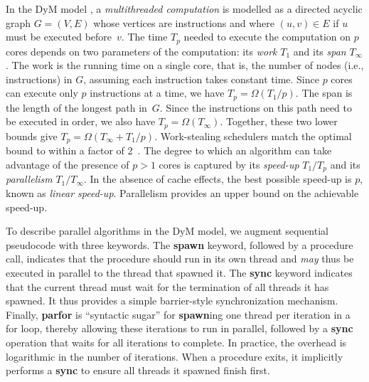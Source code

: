 In the DyM model \cite[Chapter~27]{Cormen2009}, a {\em multithreaded
computation} is modelled as a directed acyclic graph $G=(V,E)$
whose vertices are instructions and where $(u,v) \in E$ if
$u$ must be executed before~$v$.  The time $T_p$ needed to execute the
computation on $p$ cores depends on two parameters of the computation:
its {\em work} $T_1$ and its {\em span} $T_\infty$.  The work is the
running time on a single core, that is, the number of nodes
(i.e., instructions) in $G$, assuming each instruction takes constant
time.  Since $p$ cores can execute only $p$ instructions at a time, we
have $T_p = \Omega(T_1/p)$.  The span is the length of the longest
path in~$G$.  Since the instructions on this path need to be executed
in order, we also have $T_p = \Omega(T_\infty)$.
Together, these two lower bounds give $T_p = \Omega(T_\infty +
T_1/p)$.
Work-stealing schedulers match the optimal bound to within
a factor of 2~\cite{Blumofe:1999:SMC:324133.324234}.  The degree to
which an algorithm can take advantage of the presence of $p > 1$ cores
is captured by its {\em speed-up} $T_1 / T_p$ and its {\em
parallelism} $T_1 / T_\infty$.  In the absence of cache effects, the
best possible speed-up is $p$, known as {\em linear speed-up}.
Parallelism provides an upper bound on the achievable speed-up.

To describe parallel algorithms in the DyM model, we augment
sequential pseudocode with three keywords.  The {\bf spawn} keyword,
followed by a procedure call, indicates that the procedure should run
in its own thread and {\em may} thus be executed in parallel to the
thread that spawned it.  The {\bf sync} keyword
indicates that the current thread must wait for the termination of all
threads it has spawned.  It thus provides a
simple barrier-style synchronization mechanism.  Finally, {\bf parfor}
is ``syntactic sugar'' for {\bf spawn}ing one thread per iteration in
a for loop, thereby allowing these iterations to run in parallel,
followed by a {\bf sync} operation that waits for all iterations to
complete.  In practice, the overhead is logarithmic in the number of
iterations.  When a procedure exits, it implicitly performs a {\bf sync} to
ensure all threads it spawned finish first.
